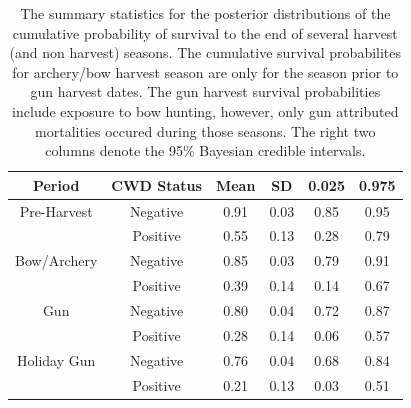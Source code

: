 \documentclass[12pt]{article}\usepackage[]{graphicx}\usepackage[]{color}
\begin{document}
\begin{table}[H]
\centering
\caption{The summary statistics for the posterior distributions of the cumulative probability of survival to the end of several harvest (and non harvest) seasons. The cumulative survival probabilites for archery/bow harvest season are only for the season prior to gun harvest dates. The gun harvest survival probabilities include exposure to bow hunting, however, only gun attributed mortalities occured during those seasons. The right two columns denote the 95\% Bayesian credible intervals.} 
\label{tab:survival_v7}
\begin{tabular}{cccccc}
 Period & CWD Status & Mean & SD & 0.025 & 0.975 \\ 
  \hline
\hline
Pre-Harvest & Negative & 0.91 & 0.03 & 0.85 & 0.95 \\ 
   & Positive & 0.55 & 0.13 & 0.28 & 0.79 \\ 
   \hdashline 
Bow/Archery & Negative & 0.85 & 0.03 & 0.79 & 0.91 \\ 
   & Positive & 0.39 & 0.14 & 0.14 & 0.67 \\ 
   \hdashline 
Gun & Negative & 0.80 & 0.04 & 0.72 & 0.87 \\ 
   & Positive & 0.28 & 0.14 & 0.06 & 0.57 \\ 
   \hdashline 
Holiday Gun & Negative & 0.76 & 0.04 & 0.68 & 0.84 \\ 
   & Positive & 0.21 & 0.13 & 0.03 & 0.51 \\ 
   \hline
\hline
\end{tabular}
\end{table}
\end{document}
